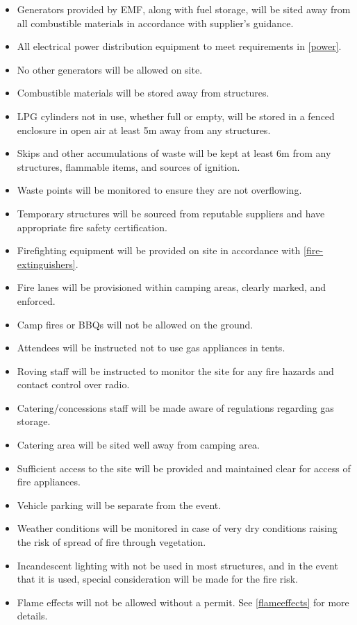 \begin{itemize}
\tightlist
\item Generators provided by EMF, along with fuel storage, will be sited away from all
      combustible materials in accordance with supplier's guidance.
\item All electrical power distribution equipment to meet requirements in \cref{power}.
\item No other generators will be allowed on site.
\item Combustible materials will be stored away from structures.
\item LPG cylinders not in use, whether full or empty, will be stored in a fenced enclosure in open air at least 5m
      away from any structures.
\item Skips and other accumulations of waste will be kept at least 6m from any structures, flammable items, and sources of ignition.
\item Waste points will be monitored to ensure they are not overflowing.
\item Temporary structures will be sourced from reputable suppliers and have appropriate fire safety certification.
\item Firefighting equipment will be provided on site in accordance with \cref{fire-extinguishers}.
\item Fire lanes will be provisioned within camping areas, clearly marked, and enforced.
\item Camp fires or BBQs will not be allowed on the ground.
\item Attendees will be instructed not to use gas appliances in tents.
\item Roving staff will be instructed to monitor the site for any fire hazards and contact control over radio.
\item Catering/concessions staff will be made aware of regulations regarding gas storage.
\item Catering area will be sited well away from camping area.
\item Sufficient access to the site will be provided and maintained clear for access of fire appliances.
\item Vehicle parking will be separate from the event.
\item Weather conditions will be monitored in case of very dry conditions raising the risk of spread of fire through vegetation.
\item Incandescent lighting with not be used in most structures, and in the event that it is used, special consideration will be made for the fire risk.
\item Flame effects will not be allowed without a permit. See \cref{flameeffects} for more details.
\end{itemize}

